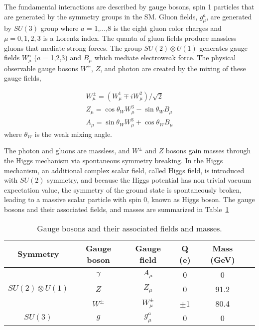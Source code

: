 The fundamental interactions are described by gauge bosons, spin 1 particles that are generated by the symmetry groups in the SM. Gluon fields, $g^{a}_{\mu}$, are generated by $SU(3)$ group where $a$ = 1,...,8 is the eight gluon color charges and $\mu= 0,1,2,3$ is a Lorentz index. The quanta of gluon fields produce massless gluons that mediate strong forces. The group $SU(2) \otimes U(1)$ generates gauge fields $W^{a}_{\mu}$ ($a$ = 1,2,3) and $B_{\mu}$ which mediate electroweak force. The physical observable gauge bosons $W^{\pm}$, $Z$, and photon are created by the mixing of these gauge fields, 

\begin{equation}
\label{eq:electroweak_mixing}
\begin{split}
	W^{\pm}_{\mu} = (W^{1}_{\mu} \mp iW^{2}_{\mu}) / \sqrt{2} \\
	Z_{\mu} = \cos \theta_{W} W^{3}_{\mu} - \sin\theta_{W} B_{\mu} \\
	A_{\mu} = \sin \theta_{W} W^{3}_{\mu} + \cos\theta_{W} B_{\mu}
\end{split}
\end{equation}
%
where $\theta_{W}$ is the weak mixing angle.

The photon and gluons are massless, and $W^{\pm}$ and $Z$ bosons gain masses through the Higgs mechanism via spontaneous symmetry breaking. In the Higgs mechanism, an additional complex scalar field, called Higgs field, is introduced with $SU(2)$ symmetry, and because the Higgs potential has non trivial vacuum expectation value, the symmetry of the ground state is spontaneously broken, leading to a massive scalar particle with spin 0, known as Higgs boson. The gauge bosons and their associated fields, and masses are summarized in Table~\ref{table:gauge_bosons}

\begin{table}[!htb]
  \centering
  \begin{tabular}{c c c c c c}
    \hline
    \hline
	Symmetry	& Gauge boson	& Gauge field	& Q (e) & Mass (GeV) \\
	\hline
	\multirow{3}{*}{$SU(2) \otimes U(1)$} & $\gamma$  &	$A_{\mu}$       & 0	   	& 0 	\\
										  & $Z$		  &	$Z_{\mu}$       & 0	   	& 91.2 	\\
										  & $W^{\pm}$ &	$W_{\mu}^{\pm}$ & $\pm$1  & 80.4 	\\
	\hline
	$SU(3)$								  & $g$		  &	$g^{a}_{\mu}$   &  0		& 0		\\

    \hline
    \hline
  \end{tabular}
  \caption{Gauge bosons and their associated fields and masses.}
  \label{table:gauge_bosons}
\end{table}


